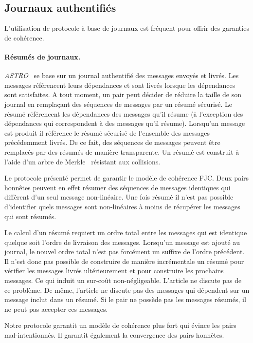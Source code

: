 \subsection{Journaux authentifiés}



L'utilisation de protocole à base de journaux est fréquent pour offrir des garanties de cohérence.

\paragraph{Résumés de journaux.} \emph{ASTRO}~\autocite{mahajan_astro_2008} se base sur un journal authentifié des messages envoyés et livrés.
Les messages référencent leurs dépendances et sont livrés lorsque les dépendances sont satisfaites.
A tout moment, un pair peut décider de réduire la taille de son journal en remplaçant des séquences de messages par un résumé sécurisé.
Le résumé référencent les dépendances des messages qu'il résume (à l'exception des dépendances qui correspondent à des messages qu'il résume).
Lorsqu'un message est produit il référence le résumé sécurisé de l'ensemble des messages précédemment livrés.
De ce fait, des séquences de messages peuvent être remplacés par des résumés de manière transparente.
Un résumé est construit à l'aide d'un arbre de Merkle~\autocite{merkle_1979_merkletree} résistant aux collisions.

Le protocole présenté permet de garantir le modèle de cohérence \acf{FJC}.
Deux pairs honnêtes peuvent en effet résumer des séquences de messages identiques qui diffèrent d'un seul message non-linéaire.
Une fois résumé il n'est pas possible d'identifier quels messages sont non-linéaires à moins de récupérer les messages qui sont résumés.

Le calcul d'un résumé requiert un ordre total entre les messages qui est identique quelque soit l'ordre de livraison des messages.
Lorsqu'un message est ajouté au journal, le nouvel ordre total n'est pas forcément un suffixe de l'ordre précédent.
Il n'est donc pas possible de construire de manière incrémentale un résumé pour vérifier les messages livrés ultérieurement et pour construire les prochains messages.
Ce qui induit un sur-coût non-négligeable.
L'article ne discute pas de ce problème.
De même, l'article ne discute pas des messages qui dépendent sur un message inclut dans un résumé.
Si le pair ne possède pas les messages résumés, il ne peut pas accepter ces messages.

Notre protocole garantit un modèle de cohérence plus fort qui évince les pairs mal-intentionnés.
Il garantit également la convergence des pairs honnêtes.

